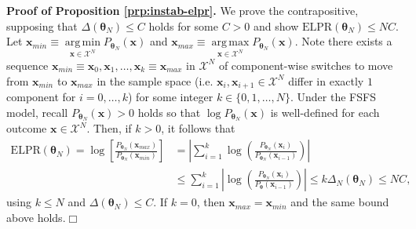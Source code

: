 \documentclass[]{article}
\theoremstyle{definition}
\DeclareMathOperator*{\argmin}{arg\,min}
\DeclareMathOperator*{\argmax}{arg\,max}
\begin{document}
\textbf{Proof of Proposition \ref{prp:instab-elpr}.} We prove the
contrapositive, supposing that \(\Delta(\boldsymbol \theta_N) \le C\)
holds for some \(C > 0\) and show
\(\text{ELPR}(\boldsymbol \theta_N) \leq NC\). Let
\(\boldsymbol x_{min} \equiv \argmin\limits_{\boldsymbol x \in \mathcal{X}^N}P_{\boldsymbol \theta_N}(\boldsymbol x)\)
and
\(\boldsymbol x_{max} \equiv \argmax\limits_{\boldsymbol x \in \mathcal{X}^N}P_{\boldsymbol \theta_N}(\boldsymbol x)\).
Note there exists a sequence
\(\boldsymbol x_{min} \equiv \boldsymbol x_0, \boldsymbol x_1, \dots, \boldsymbol x_k \equiv \boldsymbol x_{max}\)
in \(\mathcal{X}^N\) of component-wise switches to move from
\(\boldsymbol x_{min}\) to \(\boldsymbol x_{max}\) in the sample space
(i.e. \(\boldsymbol x_i, \boldsymbol x_{i + 1} \in \mathcal{X}^N\)
differ in exactly \(1\) component for \(i = 0, \dots, k\)) for some
integer \(k \in \{0, 1, \dots, N\}\). Under the FSFS model, recall
\(P_{\boldsymbol \theta_N}(\boldsymbol x) > 0\) holds so that
\(\log P_{\boldsymbol \theta_N}(\boldsymbol x)\) is well-defined for
each outcome \(\boldsymbol x \in \mathcal{X}^N\). Then, if \(k > 0\), it
follows that
\begin{align*}
\text{ELPR}(\boldsymbol \theta_N) = \log\left[\frac{P_{\boldsymbol \theta_N}(\boldsymbol x_{max})}{P_{\boldsymbol \theta_N}(\boldsymbol x_{min})}\right] &= \left|\sum\limits_{i = 1}^k\log\left(\frac{P_{\boldsymbol \theta_N}(\boldsymbol x_i)}{P_{\boldsymbol \theta_N}(\boldsymbol x_{i-1})}\right)\right| \\
&\le \sum\limits_{i = 1}^k\left|\log\left(\frac{P_{\boldsymbol \theta_N}(\boldsymbol x_i)}{P_{\boldsymbol \theta}(\boldsymbol x_{i-1})}\right)\right| \le k \Delta_N(\boldsymbol \theta_N) \le NC,
\end{align*}
using \(k \le N\) and \(\Delta(\boldsymbol \theta_N) \le C\). If
\(k = 0\), then \(\boldsymbol x_{max} = \boldsymbol x_{min}\) and the
same bound above holds.\hfill \(\Box\)
\end{document}
